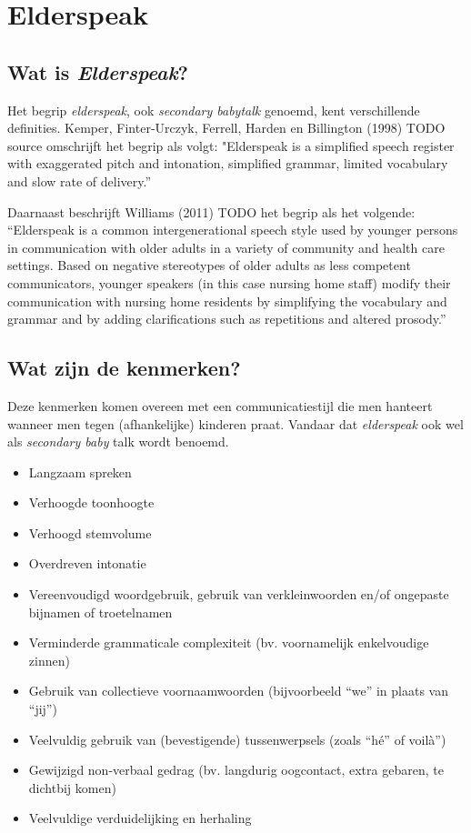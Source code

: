\section{Elderspeak}

\subsection{Wat is \textit{Elderspeak}?}

Het begrip \textit{elderspeak}, ook \textit{secondary babytalk} genoemd, kent verschillende definities. Kemper, Finter‐Urczyk, Ferrell, Harden en Billington (1998) TODO source omschrijft het begrip als volgt:
"Elderspeak is a simplified speech register with exaggerated pitch and intonation, simplified grammar, limited vocabulary and slow rate of delivery.”

Daarnaast beschrijft Williams (2011) TODO het begrip als het volgende:
“Elderspeak is a common intergenerational speech style used by younger persons in communication with older adults in a variety of community and health care settings. Based on negative stereotypes of older adults as less competent communicators, younger speakers (in this case nursing home staff) modify their communication with nursing home residents by simplifying the vocabulary and grammar and by adding clarifications such as repetitions and altered prosody.”

\subsection{Wat zijn de kenmerken?}
Deze kenmerken komen overeen met een communicatiestijl die men hanteert wanneer men tegen (afhankelijke) kinderen praat. Vandaar dat \textit{elderspeak} ook wel als \textit{secondary baby} talk wordt benoemd.

\begin{itemize}
    \item Langzaam spreken
    \item Verhoogde toonhoogte
    \item Verhoogd stemvolume
    \item Overdreven intonatie
    \item Vereenvoudigd woordgebruik, gebruik van verkleinwoorden en/of ongepaste bijnamen of troetelnamen
    \item Verminderde grammaticale complexiteit (bv. voornamelijk enkelvoudige zinnen)
    \item Gebruik van collectieve voornaamwoorden (bijvoorbeeld “we” in plaats van “jij”)
    \item Veelvuldig gebruik van (bevestigende) tussenwerpsels (zoals “hé” of voilà”)
    \item Gewijzigd non-verbaal gedrag (bv. langdurig oogcontact, extra gebaren, te dichtbij komen)
    \item Veelvuldige verduidelijking en herhaling
\end{itemize}

